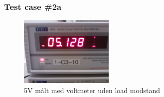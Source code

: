 \subsubsection{Test case \#2a}
\begin{figure}[hbpt]
\centering
\includegraphics[width = 0.4\textwidth]{billeder/5V_0A}
\caption{5V målt med voltmeter uden load modstand}
\label{fig:udgang_5V_0A}
\end{figure}
